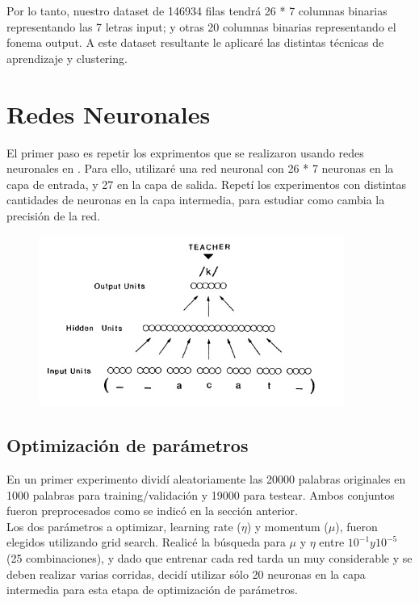 \documentclass[paper=a4, fontsize=11pt]{scrartcl} %
\numberwithin{equation}{section} %
\numberwithin{figure}{section} %
\numberwithin{table}{section} %
\begin{document}
Por lo tanto, nuestro dataset de 146934 filas tendrá 26 * 7 columnas binarias representando las 7 letras input; y otras 20 columnas binarias representando el fonema output. A este dataset resultante le aplicaré las distintas técnicas de aprendizaje y clustering.

\section{Redes Neuronales}
El primer paso es repetir los exprimentos que se realizaron usando redes neuronales en \cite{parallel}. Para ello, utilizaré una red neuronal con 26 * 7 neuronas en la capa de entrada, y 27 en la capa de salida. Repetí los experimentos con distintas cantidades de neuronas en la capa intermedia, para estudiar como cambia la precisión de la red.

\begin{figure}[h!]
\centering
\includegraphics[width=100mm]{figure1.jpg}
\end{figure}


\subsection{Optimización de parámetros}

En un primer experimento dividí aleatoriamente las 20000 palabras originales en 1000 palabras para training/validación y 19000 para testear. Ambos conjuntos fueron preprocesados como se indicó en la sección anterior. \\

Los dos parámetros a optimizar, learning rate ($\eta$) y momentum ($\mu$), fueron elegidos utilizando grid search. Realicé la búsqueda para $\mu$ y $\eta$ entre  $10^{-1} y 10^{-5}$ (25 combinaciones), y dado que entrenar cada red tarda un muy considerable y se deben realizar varias corridas, decidí utilizar sólo 20 neuronas en la capa intermedia para esta etapa de optimización de parámetros. \\
\end{document}
